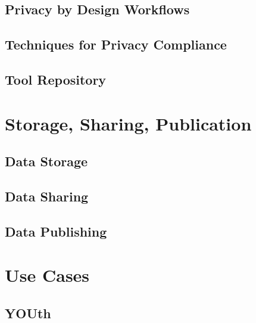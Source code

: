 \documentclass[
]{book}
\begin{document}
\hypertarget{privacy-by-design-workflows}{%
\chapter*{Privacy by Design Workflows}\label{privacy-by-design-workflows}}

\hypertarget{techniques-for-privacy-compliance}{%
\chapter*{Techniques for Privacy Compliance}\label{techniques-for-privacy-compliance}}

\hypertarget{tool-repository}{%
\chapter*{Tool Repository}\label{tool-repository}}

\hypertarget{part-storage-sharing-publication}{%
\part{Storage, Sharing, Publication}\label{part-storage-sharing-publication}}

\hypertarget{data-storage}{%
\chapter*{Data Storage}\label{data-storage}}

\hypertarget{data-sharing}{%
\chapter*{Data Sharing}\label{data-sharing}}

\hypertarget{data-publishing}{%
\chapter*{Data Publishing}\label{data-publishing}}

\hypertarget{part-use-cases}{%
\part{Use Cases}\label{part-use-cases}}

\hypertarget{youth}{%
\chapter{YOUth}\label{youth}}

  
\end{document}
